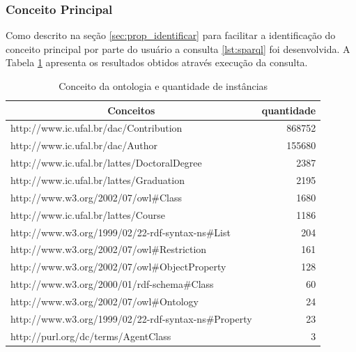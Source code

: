 \subsubsection{Conceito Principal}
Como descrito na seção \ref{sec:prop_identificar} para facilitar a identificação do conceito principal por parte do usuário a consulta \ref{lst:sparql} foi desenvolvida. A Tabela \ref{tab:estudo_sparql1} apresenta os resultados obtidos através execução da consulta. 

\begin{table}[h]
	\centering
	\caption{Conceito da ontologia e quantidade de instâncias}
	\label{tab:estudo_sparql1}
	\begin{tabular}{@{}|l|r|@{}}
		\hline
		\multicolumn{1}{|c|}{\textbf{Conceitos}}               & \multicolumn{1}{c|}{\textbf{quantidade}} \\ \hline
		http://www.ic.ufal.br/dac/Contribution               & 868752                              \\ \hline
		http://www.ic.ufal.br/dac/Author                     & 155680                              \\ \hline
		http://www.ic.ufal.br/lattes/DoctoralDegree          & 2387                                \\ \hline
		http://www.ic.ufal.br/lattes/Graduation              & 2195                                \\ \hline
		http://www.w3.org/2002/07/owl\#Class                 & 1680                                \\ \hline
		http://www.ic.ufal.br/lattes/Course                  & 1186                                \\ \hline
		http://www.w3.org/1999/02/22-rdf-syntax-ns\#List     & 204                                 \\ \hline
		http://www.w3.org/2002/07/owl\#Restriction           & 161                                 \\ \hline
		http://www.w3.org/2002/07/owl\#ObjectProperty        & 128                                 \\ \hline
		http://www.w3.org/2000/01/rdf-schema\#Class          & 60                                  \\ \hline
		http://www.w3.org/2002/07/owl\#Ontology              & 24                                  \\ \hline
		http://www.w3.org/1999/02/22-rdf-syntax-ns\#Property & 23                                  \\ \hline
		http://purl.org/dc/terms/AgentClass                  & 3                                   \\ \hline
	\end{tabular}
\end{table}

